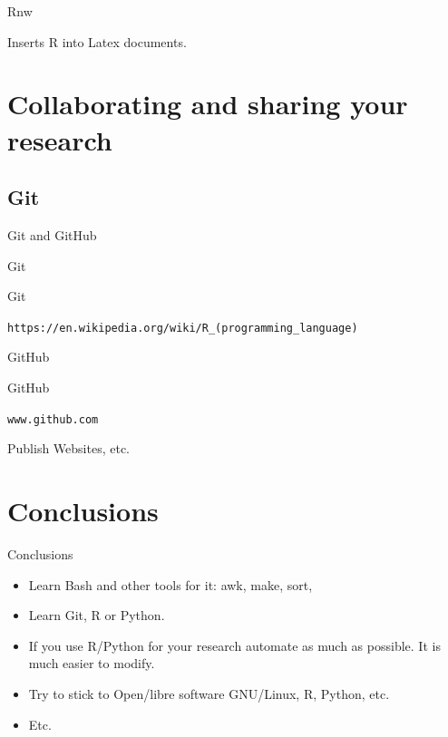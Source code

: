 \documentclass{beamer}
\begin{document}
\begin{frame}{Rnw} %

Inserts R into Latex documents.

\end{frame}


\section[Collaborating and sharing]{Collaborating and sharing your research}


\subsection{Git}{Git and GitHub}


\begin{frame}{Git} %

Git 

\texttt{https://en.wikipedia.org/wiki/R\_(programming\_language)}
\end{frame}


\begin{frame}{GitHub} %

GitHub 

\texttt{www.github.com}

Publish Websites, etc.

\end{frame}




\section{Conclusions}

\begin{frame}{Conclusions} %

\begin{itemize}
  \item Learn Bash and other tools for it: awk, make, sort, 
  \item Learn  Git, R or Python.
  \item If you use R/Python for your research automate as much as possible. It is much easier to modify.
  \item Try to stick to Open/libre software GNU/Linux, R, Python, etc.
  \item Etc.
\end{itemize}

\end{frame}
\end{document}
